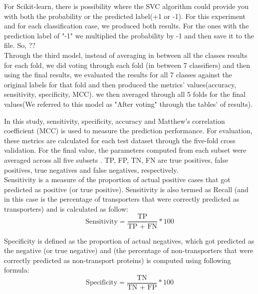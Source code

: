     For Scikit-learn, there is possibility where the SVC algorithm could provide you with both the probability or the 
    predicted label(+1 or -1). For this experiment and for each classification case, we produced both results. For the ones with 
    the prediction label of "-1" we multiplied the probability by -1 and then save it to the file. So, ??\\
    
    Through the third model, instead of averaging in between all the classes results for each fold, we did voting through each fold 
    (in between 7 classifiers) and then using the final results, we evaluated the results for all 7 classes against the original labels 
    for that fold and then produced the metrics' values(accuracy, sensitivity, specificity, MCC). we then averaged through all 5 folds 
    for the final values(We referred to this model as "After voting" through the tables' of results).\\

    

        
        In this study, sensitivity, specificity, accuracy and Matthew's correlation coefficient (MCC) is used to measure the 
        prediction performance. For evaluation, these metrics are calculated for each test dataset through the five-fold cross validation.
        For the final value, the parameters computed from each subset were averaged across all five subsets . TP, FP, TN, FN are 
        true positives, false positives, true negatives and false negatives, respectively. \\

        Sensitivity is a measure of the proportion of actual positive cases that got predicted as positive (or true positive). 
        Sensitivity is also termed as Recall (and in this case is the percentage of transporters 
        that were correctly predicted as transporters) and is calculated as follow:
        \begin{equation}
            \text{Sensitivity} = \frac {\text{TP}}{\text{TP + FN}} * 100
        \end{equation}

        Specificity is defined as the proportion of actual negatives, which got predicted as the negative (or true negative) and 
        (the percentage of non-transporters that were correctly predicted as non-transport proteins) is computed using following formula:
        \begin{equation}
            \text{Specificity} = \frac {\text{TN}}{\text{TN + FP}} * 100
        \end{equation}

